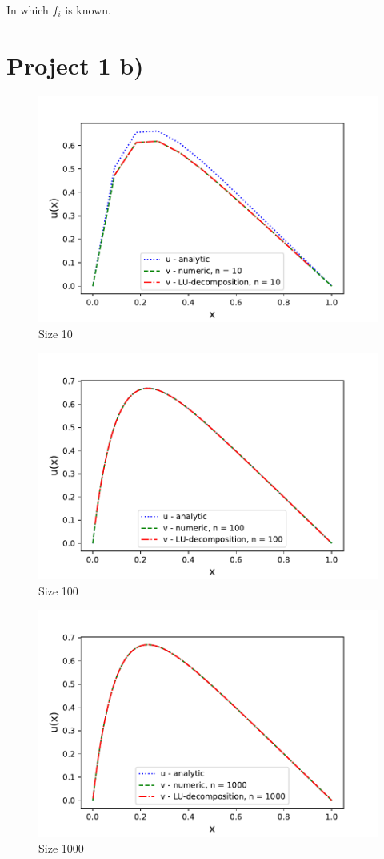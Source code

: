 \documentclass{article}
\begin{document}
In which $f_i$ is known. 

\section{Project 1 b)}

\begin{figure}[h]
    \centering
    \includegraphics[width =12cm]{python/size_10.pdf}
    \caption{Size 10}
    \label{fig:1}
\end{figure}

\begin{figure}[h]
    \centering
    \includegraphics[width =12cm]{python/size_100.pdf}
    \caption{Size 100}
    \label{fig:2}
\end{figure}


\begin{figure}[h]
    \centering
    \includegraphics[width =12cm]{python/size_1000.pdf}
    \caption{Size 1000}
    \label{fig:3}
\end{figure}
\end{document}
